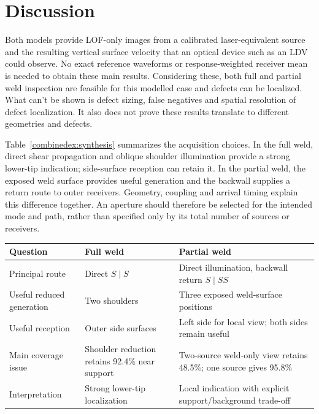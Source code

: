 \section{Discussion}
\label{combinedex:discussion}
Both models provide LOF-only images from a calibrated laser-equivalent source and the resulting vertical surface velocity that an optical device such as an LDV could observe. No exact reference waveforms or response-weighted receiver mean is needed to obtain these main results. Considering these, both full and partial weld inspection are feasible for this modelled case and defects can be localized. What can't be shown is defect sizing, false negatives and spatial resolution of defect localization. It also does not prove these results translate to different geometries and defects.

Table~\ref{combinedex:synthesis} summarizes the acquisition choices. In the full weld, direct shear propagation and oblique shoulder illumination provide a strong lower-tip indication; side-surface reception can retain it. In the partial weld, the exposed weld surface provides useful generation and the backwall supplies a return route to outer receivers. Geometry, coupling and arrival timing explain this difference together. An aperture should therefore be selected for the intended mode and path, rather than specified only by its total number of sources or receivers. 

\par\medskip\noindent\begin{minipage}{\linewidth}\centering\small
{}
\begin{tabularx}{\linewidth}{@{}l>{\raggedright\arraybackslash}X>{\raggedright\arraybackslash}X@{}}\toprule
Question & Full weld & Partial weld\\\midrule
Principal route & Direct $S\mid S$ & Direct illumination, backwall return $S\mid SS$\\
Useful reduced generation & Two shoulders & Three exposed weld-surface positions\\
Useful reception & Outer side surfaces & Left side for local view; both sides remain useful\\
Main coverage issue & Shoulder reduction retains 92.4\% near support & Two-source weld-only view retains 48.5\%; one source gives 95.8\%\\
Interpretation & Strong lower-tip localization & Local indication with explicit support/background trade-off\\
\bottomrule\end{tabularx}
\label{combinedex:synthesis}
\end{minipage}\par\medskip

